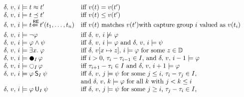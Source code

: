 \begin{figure}
\[\begin{array}{@{}ll@{\;\;}@{\;\;}ll@{}}
			\delta,\,v,\,i \models t \approx t'                           & \text{iff } v(t) = v(t')                                                                                                     &   & \\
			\delta,\,v,\,i \models t \preceq t'                           & \text{iff } v(t) \leq v(t')                                                                                                  &   & \\
			\delta,\,v,\,i \models t \mfodlmatches\; t' (t_1,\ldots, t_n) & \text{iff } v(t) \text{ matches } v(t')
			\text{with capture group } i \text{ valued as } v(t_i)        &                                                                                                                              &     \\
			\delta,\,v,\,i \models \lnot \varphi                          & \text{iff } \delta,\,v,\,i \not\models \varphi                                                                               &   & \\
			\delta,\,v,\,i \models \varphi \land \psi                     & \text{iff } \delta,\,v,\,i \models \varphi \text{ and } \delta,\,v,\,i \models \psi                                          &   & \\
			\delta,\,v,\,i \models \exists x.\;\varphi                    & \text{iff } \delta,\,v[x \mapsto z],\,i \models \varphi \text{ for some \(z \in \mfodlDomain\)}                              &   & \\
			\delta,\,v,\,i \models \mfodlPrev_I \varphi                   & \text{iff \(i > 0\), \(\tau_i - \tau_{i-1} \in I\), and } \delta,\,v,\,i-1 \models \varphi                                   &   & \\
			\delta,\,v,\,i \models \mfodlNext_I \varphi                   & \text{iff \(\tau_{i+1} - \tau_i \in I\) and } \delta,\,v,\,i+1 \models \varphi                                               &   & \\
			\delta,\,v,\,i \models \varphi \mfodlSince_I \psi             & \multicolumn{3}{l@{}}{\text{iff } \delta,\,v,\,j \models \psi \text{ for some \(j \leq i\), \(\tau_i - \tau_j \in I\),}}           \\
			                                                              & \text{and } \delta,\,v,\,k \models \varphi \text{ for all \(k\) with \(j < k \leq i\)}                                       &   & \\
			\delta,\,v,\,i \models \varphi \mfodlUntil_I \psi             & \multicolumn{3}{l@{}}{\text{iff } \delta,\,v,\,j \models \psi \text{ for some \(j \geq i\), \(\tau_j - \tau_i \in I\), }}          \\

\end{array}\]
\end{figure}
